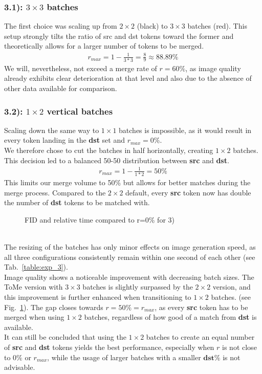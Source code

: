 \subsubsection*{3.1): $3 \times 3$ batches}
The first choice was scaling up from $2 \times 2$ (black) to $3 \times 3$ batches (red). This setup strongly tilts the ratio of src and dst tokens toward the former and theoretically allows for a larger number of tokens to be merged. 
\begin{align*}
    r_{max} = 1-\frac{1}{3*3} = \frac{8}{9} \approx 88.89\%
\end{align*}
We will, nevertheless, not exceed a merge rate of \(r=60\%\), as image quality already exhibits clear deterioration at that level and also due to the absence of other data available for comparison.



\subsubsection*{3.2): $1 \times 2$ vertical batches}
Scaling down the same way to $1 \times 1$ batches is impossible, as it would result in every token landing in the \textbf{dst} set and \(r_{max}=0\%\).\\
We therefore chose to cut the batches in half horizontally, creating $1 \times 2$ batches. This decision led to a balanced 50-50 distribution between \textbf{src} and \textbf{dst}.
\begin{align*}
    r_{max} = 1-\frac{1}{1*2} = 50\%
\end{align*}
This limits our merge volume to 50\% but allows for better matches during the merge process. Compared to the $2 \times 2$ default, every \textbf{src} token now has double the number of \textbf{dst} tokens to be matched with.\\
\begin{figure}[!htb]
    
    
\caption{FID and relative time compared to r=0\% for 3)}
\label{fig:exp_3}
\end{figure}\\
The resizing of the batches has only minor effects on image generation speed, as all three configurations consistently remain within one second of each other (see Tab.~\ref{table:exp_3}).\\
Image quality shows a noticeable improvement with decreasing batch sizes. The ToMe version with $3 \times 3$ batches is slightly surpassed by the $2 \times 2$ version, and this improvement is further enhanced when transitioning to $1 \times 2$ batches. (see Fig.~\ref{fig:exp_3}).
The gap closes towards \(r=50\%=r_{max}\), as every \textbf{src} token has to be merged when using $1 \times 2$ batches, regardless of how good of a match from \textbf{dst} is available.\\
It can still be concluded that using the $1 \times 2$ batches to create an equal number of \textbf{src} and \textbf{dst} tokens yields the best performance, especially when \(r\) is not close to \(0\%\) or \(r_{max}\), while the usage of larger batches with a smaller \(\textbf{dst\%}\) is not advisable.




